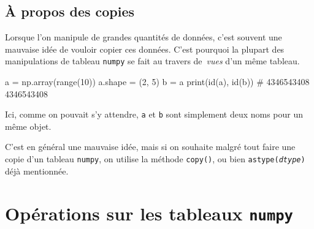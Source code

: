 \documentclass[10pt,fleqn]{article} %
\begin{document}
\subsection{À propos des copies}
Lorsque l'on manipule de grandes quantités de données, c'est souvent
une mauvaise idée de vouloir copier ces données. C'est pourquoi la
plupart des manipulations de tableau \texttt{numpy} se fait au travers
de~\emph{vues} d'un même tableau.

\begin{python}
a = np.array(range(10))
a.shape = (2, 5)
b = a
print(id(a), id(b))
# 4346543408 4346543408  
\end{python}
Ici, comme on pouvait s'y attendre, \texttt{a} et \texttt{b} sont
simplement deux noms pour un même objet.


%
%

\begin{remark}
C'est en général une mauvaise idée, mais si on souhaite malgré tout
faire une copie d'un tableau \texttt{numpy}, on utilise la méthode
\texttt{copy()}, ou bien \texttt{astype(\textit{dtype})} déjà
mentionnée.
\end{remark}

\section{Opérations sur les tableaux \texttt{numpy}}
\end{document}
